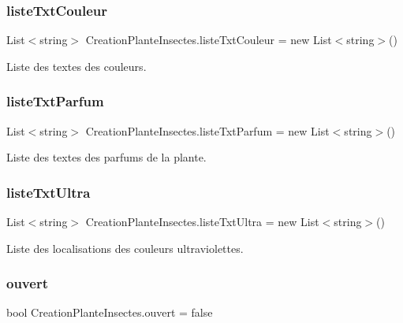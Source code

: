 \subsubsection{\texorpdfstring{liste\+Txt\+Couleur}{listeTxtCouleur}}
{\footnotesize\ttfamily List$<$string$>$ Creation\+Plante\+Insectes.\+liste\+Txt\+Couleur = new List$<$string$>$()}

Liste des textes des couleurs. \mbox{\label{class_creation_plante_insectes_a793d5f29e033929d9cf2e7b1135fc2b8}} 
\subsubsection{\texorpdfstring{liste\+Txt\+Parfum}{listeTxtParfum}}
{\footnotesize\ttfamily List$<$string$>$ Creation\+Plante\+Insectes.\+liste\+Txt\+Parfum = new List$<$string$>$()}

Liste des textes des parfums de la plante. \mbox{\label{class_creation_plante_insectes_a57143b0fe9a139ef2fac4d47ac57c81d}} 
\subsubsection{\texorpdfstring{liste\+Txt\+Ultra}{listeTxtUltra}}
{\footnotesize\ttfamily List$<$string$>$ Creation\+Plante\+Insectes.\+liste\+Txt\+Ultra = new List$<$string$>$()}

Liste des localisations des couleurs ultraviolettes. \mbox{\label{class_creation_plante_insectes_a1ee37de46d868c50d5bf63452c454da9}} 
\subsubsection{\texorpdfstring{ouvert}{ouvert}}
{\footnotesize\ttfamily bool Creation\+Plante\+Insectes.\+ouvert = false\hspace{0.3cm}{\ttfamily [static]}}

